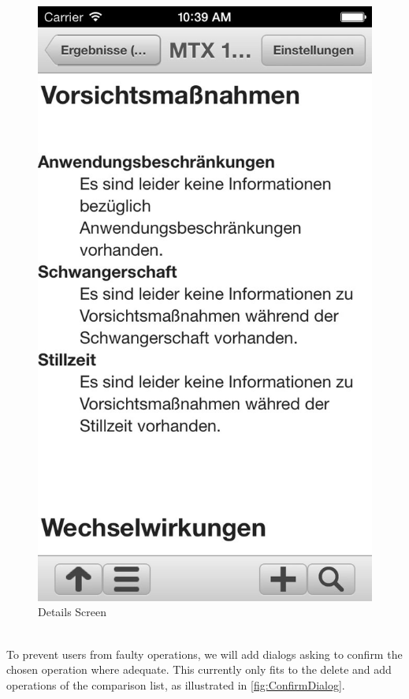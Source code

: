 \begin{figure}[!ptb]
\begin{minipage}[b]{0.45\linewidth}
        \includegraphics[width=0.8025\linewidth]{figures/Detail_bw.jpg}
        \caption[Pharmaceutical Details Screen]{Details Screen}
        \label{fig:DetailsScreen}
    \end{minipage}
\end{figure}
\\
To prevent users from faulty operations, we will add dialogs asking to confirm the chosen operation where adequate. This currently only fits to the delete and add operations of the comparison list, as illustrated in \ref{fig:ConfirmDialog}.
\\
